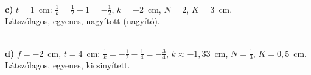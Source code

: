 \documentclass[11pt,a4paper]{article}
\newcommand{\lenskep}[5]{%
  \pgfmathsetmacro{\kk}{1/(1/#1 - 1/#2)}%
  \pgfmathsetmacro{\KK}{-#3*\kk/#2}%
  \pgfmathsetmacro{\HH}{max(#3,abs(\KK))+0.45}%
  \pgfmathtruncatemacro{\virt}{\kk<0 ? 1 : 0}%
  \pgfmathtruncatemacro{\gyujto}{#1>0 ? 1 : 0}%
  \draw[gray!25,very thin] (#4,-3.5) grid (#5,3.5);
  \draw[->,gray] (#4,0) -- (#5,0);
  \ifnum\gyujto=1
    \draw[{Stealth[length=2mm]}-{Stealth[length=2mm]},thick,blue!60!black] (0,-3.5) -- (0,3.5);
  \else
    \draw[{Stealth[length=2mm,reversed]}-{Stealth[length=2mm,reversed]},thick,blue!60!black] (0,-3.5) -- (0,3.5);
  \fi
  \fill (#1,0) circle (1.5pt) node[below,font=\scriptsize] {$F$};
  \fill (-#1,0) circle (1.5pt) node[below,font=\scriptsize] {$F$};
  \draw[very thick,-{Stealth[length=2mm]}] (-#2,0) -- (-#2,#3);
  \begin{scope}
    \clip (#4,-3.5) rectangle (#5,3.5);
    \ifnum\gyujto=1
      \draw[red!75!black] (-#2,#3) -- (0,#3) -- ($(0,#3)!8!(#1,0)$);
    \else
      \draw[red!75!black] (-#2,#3) -- (0,#3) -- ($(0,#3)!-8!(#1,0)$);
    \fi
    \draw[orange!85!black] (-#2,#3) -- ($(-#2,#3)!8!(0,0)$);
    \ifnum\virt=1
      \draw[red!75!black,dashed] (0,#3) -- (\kk,\KK);
      \draw[orange!85!black,dashed] (0,0) -- (\kk,\KK);
      \ifnum\gyujto=0 \draw[red!75!black,dashed] (\kk,\KK) -- (#1,0); \fi
      \draw[very thick,dashed,green!50!black,-{Stealth[length=2mm]}] (\kk,0) -- (\kk,\KK);
    \else
      \draw[violet] (-#2,#3) -- (0,\KK) -- (#5,\KK);
      \draw[very thick,green!50!black,-{Stealth[length=2mm]}] (\kk,0) -- (\kk,\KK);
    \fi
  \end{scope}
}
\begin{document}
\begin{enumerate}
  \vspace{8pt}
  \begin{minipage}[t]{0.49\linewidth}\centering
  \\[2pt]
  \small\textbf{c)} $t = 1$~cm: $\tfrac1k = \tfrac12 - 1 = -\tfrac12$,
  $k = -2$~cm, $N = 2$, $K = 3$~cm.\\
  Látszólagos, egyenes, nagyított (nagyító).
  \end{minipage}\hfill
  \begin{minipage}[t]{0.49\linewidth}\centering
  \\[2pt]
  \small\textbf{d)} $f = -2$~cm, $t = 4$~cm: $\tfrac1k = -\tfrac12 - \tfrac14 = -\tfrac34$,
  $k \approx -1{,}33$~cm, $N = \tfrac13$, $K = 0{,}5$~cm.
  Látszólagos, egyenes, kicsinyített.
  \end{minipage}


\end{enumerate}
\end{document}

